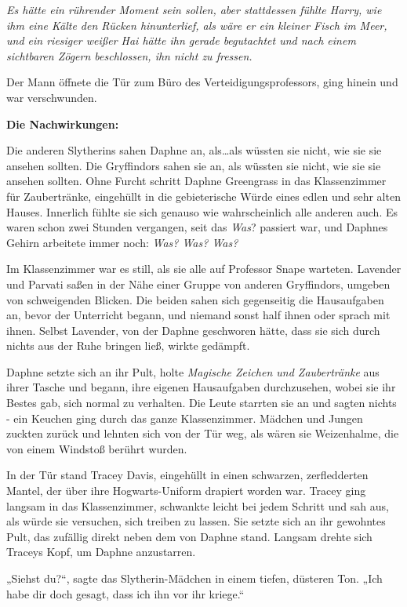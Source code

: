 {\emph{Es hätte ein rührender Moment sein sollen, aber stattdessen fühlte Harry, wie ihm eine Kälte den Rücken hinunterlief, als wäre er ein kleiner Fisch im Meer, und ein riesiger weißer Hai hätte ihn gerade begutachtet und nach einem sichtbaren Zögern beschlossen, ihn nicht zu fressen.}

Der Mann öffnete die Tür zum Büro des Verteidigungsprofessors, ging hinein und war verschwunden.

\textbf{Die Nachwirkungen:}

Die anderen Slytherins sahen Daphne an, als…als wüssten sie nicht, wie sie sie ansehen sollten. Die Gryffindors sahen sie an, als wüssten sie nicht, wie sie sie ansehen sollten. Ohne Furcht schritt Daphne Greengrass in das Klassenzimmer für Zaubertränke, eingehüllt in die gebieterische Würde eines edlen und sehr alten Hauses. Innerlich fühlte sie sich genauso wie wahrscheinlich alle anderen auch. Es waren schon zwei Stunden vergangen, seit das \emph{Was}? passiert war, und Daphnes Gehirn arbeitete immer noch: \emph{Was? Was? Was?}

Im Klassenzimmer war es still, als sie alle auf Professor Snape warteten. Lavender und Parvati saßen in der Nähe einer Gruppe von anderen Gryffindors, umgeben von schweigenden Blicken. Die beiden sahen sich gegenseitig die Hausaufgaben an, bevor der Unterricht begann, und niemand sonst half ihnen oder sprach mit ihnen. Selbst Lavender, von der Daphne geschworen hätte, dass sie sich durch nichts aus der Ruhe bringen ließ, wirkte gedämpft.

Daphne setzte sich an ihr Pult, holte \emph{Magische Zeichen und Zaubertränke} aus ihrer Tasche und begann, ihre eigenen Hausaufgaben durchzusehen, wobei sie ihr Bestes gab, sich normal zu verhalten. Die Leute starrten sie an und sagten nichts - ein Keuchen ging durch das ganze Klassenzimmer. Mädchen und Jungen zuckten zurück und lehnten sich von der Tür weg, als wären sie Weizenhalme, die von einem Windstoß berührt wurden.

In der Tür stand Tracey Davis, eingehüllt in einen schwarzen, zerfledderten Mantel, der über ihre Hogwarts-Uniform drapiert worden war. Tracey ging langsam in das Klassenzimmer, schwankte leicht bei jedem Schritt und sah aus, als würde sie versuchen, sich treiben zu lassen. Sie setzte sich an ihr gewohntes Pult, das zufällig direkt neben dem von Daphne stand. Langsam drehte sich Traceys Kopf, um Daphne anzustarren.

„Siehst du?“, sagte das Slytherin-Mädchen in einem tiefen, düsteren Ton. „Ich habe dir doch gesagt, dass ich ihn vor ihr kriege.“

}
